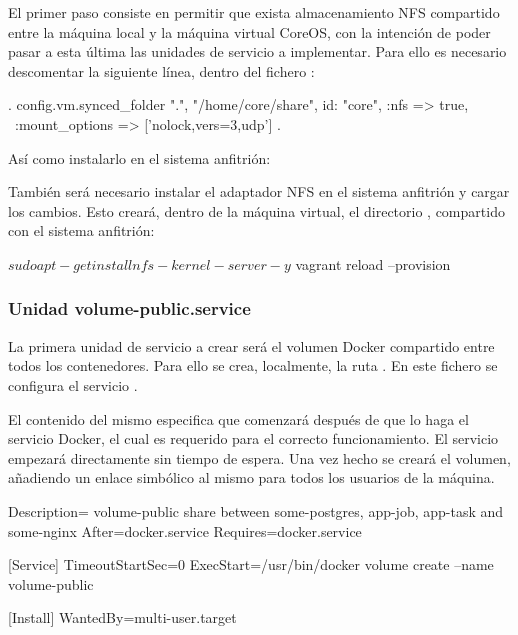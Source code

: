 El primer paso consiste en permitir que exista almacenamiento NFS compartido entre la máquina local y la máquina virtual CoreOS, con la intención de poder pasar a esta última las unidades de servicio a implementar. Para ello es necesario descomentar la siguiente línea, dentro del fichero :

\begin{codelisting}
\label{code:vagrantfile2}
\begin{code}
.
config.vm.synced_folder ".", "/home/core/share", id: "core", :nfs => true, \
:mount_options => ['nolock,vers=3,udp']
.
\end{code}
\end{codelisting}

Así como instalarlo en el sistema anfitrión:


También será necesario instalar el adaptador NFS en el sistema anfitrión y cargar los cambios. Esto creará, dentro de la máquina virtual, el directorio , compartido con el sistema anfitrión:

\begin{code}
$ sudo apt-get install nfs-kernel-server -y
$ vagrant reload --provision
\end{code}

\subsubsection{Unidad volume-public.service}

La primera unidad de servicio a crear será el volumen Docker compartido entre todos los contenedores. Para ello se crea, localmente, la ruta . En este fichero se configura el servicio . 

El contenido del mismo especifica que comenzará después de que lo haga el servicio Docker, el cual es requerido para el correcto funcionamiento. El servicio empezará directamente sin tiempo de espera. Una vez hecho se creará el volumen, añadiendo un enlace simbólico al mismo para todos los usuarios de la máquina. 

\begin{codelisting}
\label{code:volume-public.service}
\begin{code}
[Unit] 
  Description= volume-public share between some-postgres, app-job, app-task and 
               some-nginx 
  After=docker.service
  Requires=docker.service

[Service] 
  TimeoutStartSec=0 
  ExecStart=/usr/bin/docker volume create --name volume-public

[Install] 
  WantedBy=multi-user.target
\end{code}
\end{codelisting}

